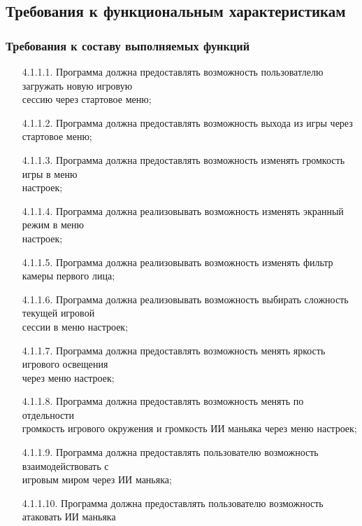 \subsection{Требования к функциональным характеристикам}

\subsubsection{Требования к составу выполняемых функций}

\begin{enumerate}
    \item[4.1.1.1.] Программа должна предоставлять возможность пользоватлелю загружать новую игровую\\
    сессию через стартовое меню;
    \item[4.1.1.2.] Программа должна предоставлять возможность выхода из игры через стартовое меню;
    \item[4.1.1.3.] Программа должна предоставлять возможность изменять громкость игры в меню \\настроек;
    \item[4.1.1.4.] Программа должна реализовывать возможность изменять экранный режим в меню \\настроек;
    \item[4.1.1.5.] Программа должна реализовывать возможность изменять фильтр камеры первого лица;
    \item[4.1.1.6.] Программа должна реализовывать возможность выбирать сложность текущей игровой\\ 
    сессии в меню настроек;
    \item[4.1.1.7.] Программа должна предоставлять возможность менять яркость игрового освещения\\
    через меню настроек;
    \item[4.1.1.8.] Программа должна предоставлять возможность менять по отдельности\\
    громкость игрового окружения и громкость ИИ маньяка через меню настроек;
    \item[4.1.1.9.] Программа должна предоставлять пользователю возможность взаимодействовать с \\
    игровым миром через ИИ маньяка;
    \item[4.1.1.10.] Программа должна предоставлять пользователю возможность атаковать ИИ маньяка\\

\end{enumerate}
